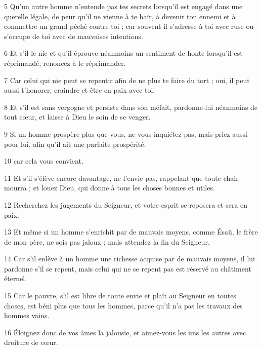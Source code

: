 \par 5 Qu'un autre homme n'entende pas tes secrets lorsqu'il est engagé dans une querelle légale, de peur qu'il ne vienne à te haïr, à devenir ton ennemi et à commettre un grand péché contre toi ; car souvent il s'adresse à toi avec ruse ou s'occupe de toi avec de mauvaises intentions.

\par 6 Et s'il le nie et qu'il éprouve néanmoins un sentiment de honte lorsqu'il est réprimandé, renoncez à le réprimander.

\par 7 Car celui qui nie peut se repentir afin de ne plus te faire du tort ; oui, il peut aussi t'honorer, craindre et être en paix avec toi.

\par 8 Et s'il est sans vergogne et persiste dans son méfait, pardonne-lui néanmoins de tout cœur, et laisse à Dieu le soin de se venger.

\par 9 Si un homme prospère plus que vous, ne vous inquiétez pas, mais priez aussi pour lui, afin qu'il ait une parfaite prospérité.

\par 10 car cela vous convient.

\par 11 Et s'il s'élève encore davantage, ne l'envie pas, rappelant que toute chair mourra ; et louez Dieu, qui donne à tous les choses bonnes et utiles.

\par 12 Recherchez les jugements du Seigneur, et votre esprit se reposera et sera en paix.

\par 13 Et même si un homme s'enrichit par de mauvais moyens, comme Ésaü, le frère de mon père, ne sois pas jaloux ; mais attendez la fin du Seigneur.

\par 14 Car s'il enlève à un homme une richesse acquise par de mauvais moyens, il lui pardonne s'il se repent, mais celui qui ne se repent pas est réservé au châtiment éternel.

\par 15 Car le pauvre, s'il est libre de toute envie et plaît au Seigneur en toutes choses, est béni plus que tous les hommes, parce qu'il n'a pas les travaux des hommes vains.

\par 16 Éloignez donc de vos âmes la jalousie, et aimez-vous les uns les autres avec droiture de cœur.

